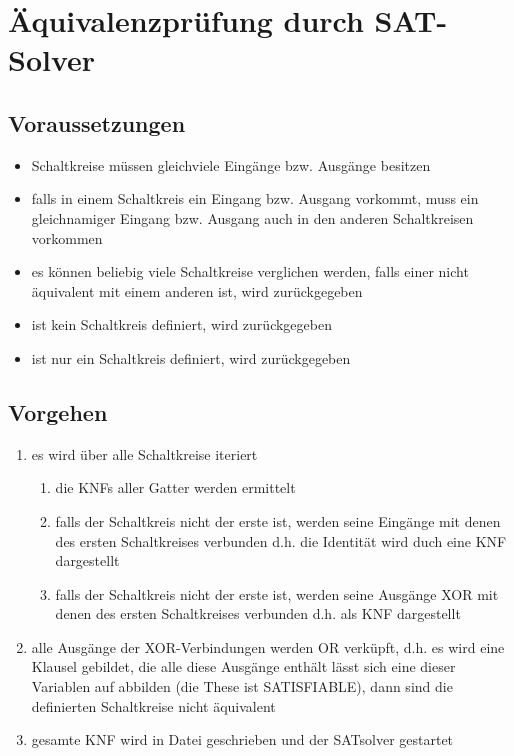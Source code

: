 \section{Äquivalenzprüfung durch SAT-Solver}

\subsection{Voraussetzungen}
\begin{itemize}
	\item Schaltkreise müssen gleichviele Eingänge bzw. Ausgänge besitzen
	\item falls in einem Schaltkreis ein Eingang bzw. Ausgang vorkommt, muss ein gleichnamiger Eingang bzw. Ausgang auch in den anderen Schaltkreisen vorkommen
	\item es können beliebig viele Schaltkreise verglichen werden, falls einer nicht äquivalent mit einem anderen ist, wird  zurückgegeben
	\item ist kein Schaltkreis definiert, wird  zurückgegeben
	\item ist nur ein Schaltkreis definiert, wird  zurückgegeben

\end{itemize}


\subsection{Vorgehen}
\begin{enumerate}
	\item es wird über alle Schaltkreise iteriert
	
	\begin{enumerate}
		\item die KNFs aller Gatter werden ermittelt
		\item falls der Schaltkreis nicht der erste ist, werden seine Eingänge mit denen des ersten Schaltkreises verbunden d.h. die Identität wird duch eine KNF dargestellt
		\item falls der Schaltkreis nicht der erste ist, werden seine Ausgänge XOR mit denen des ersten Schaltkreises verbunden d.h. als KNF dargestellt
	\end{enumerate}
	
	\item alle Ausgänge der XOR-Verbindungen werden OR verküpft, d.h. es wird eine Klausel gebildet, die alle diese Ausgänge enthält
	\subitem lässt sich eine dieser Variablen auf  abbilden (die These ist SATISFIABLE), dann sind die definierten Schaltkreise nicht äquivalent 
	\item gesamte KNF wird in Datei geschrieben und der SATsolver gestartet
\end{enumerate}


